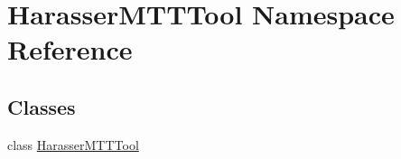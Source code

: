 \hypertarget{namespace_harasser_m_t_t_tool}{\section{Harasser\-M\-T\-T\-Tool Namespace Reference}
\label{namespace_harasser_m_t_t_tool}
}
\subsection*{Classes}
\begin{DoxyCompactItemize}
\item 
class \hyperlink{class_harasser_m_t_t_tool_1_1_harasser_m_t_t_tool}{Harasser\-M\-T\-T\-Tool}
\end{DoxyCompactItemize}
